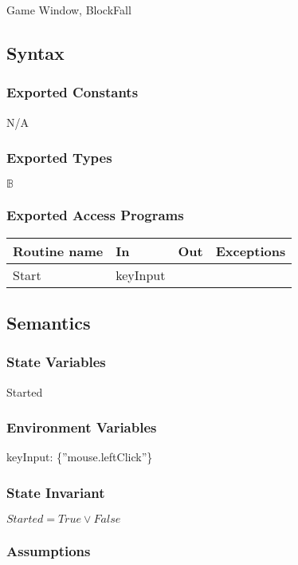 \documentclass[12pt]{article}
\begin{document}
Game Window, BlockFall

\subsection* {Syntax}

\subsubsection* {Exported Constants}
N/A
\subsubsection* {Exported Types}

$\mathbb{B}$

\subsubsection* {Exported Access Programs}

\begin{tabular}{| l | l | l | l |}
\hline
\textbf{Routine name} & \textbf{In} & \textbf{Out} & \textbf{Exceptions}\\
\hline
Start & keyInput &  &  \\
\hline
\end{tabular}

\subsection* {Semantics}

\subsubsection* {State Variables}

Started

\subsubsection* {Environment Variables}
keyInput: \{”mouse.leftClick”\}

\subsubsection* {State Invariant}

$ Started = True \lor False $

\subsubsection* {Assumptions}
\end{document}
